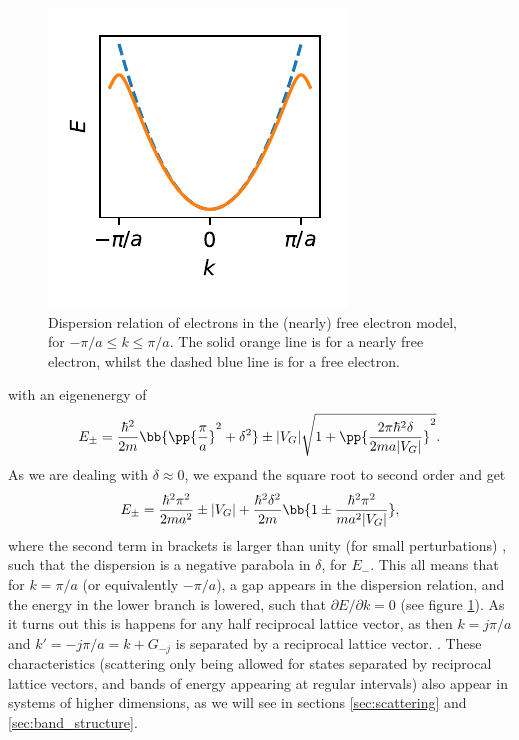 \documentclass[main.tex]{subfiles}
\begin{document}
	\begin{figure}
		\begin{center}
			\includegraphics[width=\linewidth]{figures/nearly_free.pdf}
		\end{center}
		\caption{Dispersion relation of electrons in the (nearly) free electron model, for $ -\pi/a \leq k \leq \pi/a $. The solid orange line is for a nearly free electron, whilst the dashed blue line is for a free electron.}
		\label{fig:nearly_free}
	\end{figure}
	with an eigenenergy of \cite{simon}
	\begin{equation}
		E_{\pm} = \frac{\hbar^2}{2m} \bb{\pp{\frac{\pi}{a}}^2 + \delta^2 } \pm |V_G| \sqrt{1+ \pp{\frac{2\pi\hbar^2 \delta}{2m a |V_G|}}^2 }.
	\end{equation}
	As we are dealing with $ \delta \approx 0 $, we expand the square root to second order and get
	\begin{equation}
		E_{\pm} = \frac{\hbar^2 \pi^2}{2m a^2} \pm |V_G| + \frac{\hbar^2 \delta^2}{2m} \bb{1 \pm \frac{\hbar^2 \pi^2}{m a^2 |V_G|}},
	\end{equation}
	where the second term in brackets is larger than unity (for small perturbations) \cite{simon}, such that the dispersion is a negative parabola in $ \delta $, for $ E_- $. This all means that for $ k =\pi/a$ (or equivalently $ -\pi/a $), a gap appears in the dispersion relation, and the energy in the lower branch is lowered, such that $ \partial E/ \partial k =0$ (see figure \ref{fig:nearly_free}). As it turns out this is happens for any half reciprocal lattice vector, as then $ k = j \pi/a $ and $ k'=-j \pi /a = k+G_{-j}$ is separated by a reciprocal lattice vector. . These characteristics (scattering only being allowed for states separated by reciprocal lattice vectors, and bands of energy appearing at regular intervals) also appear in systems of higher dimensions, as we will see in sections \ref{sec:scattering} and \ref{sec:band_structure}.
	
\end{document}
